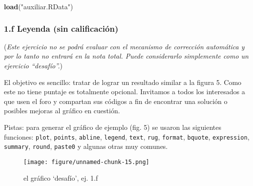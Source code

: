 \documentclass[]{article}
\makeatletter
\newenvironment{Shaded}{}{}
\newcommand{\KeywordTok}[1]{\textcolor[rgb]{0.00,0.44,0.13}{\textbf{{#1}}}}
\newcommand{\StringTok}[1]{\textcolor[rgb]{0.25,0.44,0.63}{{#1}}}
\newcommand{\NormalTok}[1]{{#1}}
\def\maxwidth{\ifdim\Gin@nat@width>\linewidth\linewidth
\else\Gin@nat@width\fi}
\let\Oldincludegraphics\includegraphics
\renewcommand{\includegraphics}[1]{\Oldincludegraphics[width=\maxwidth]{#1}}
\makeatother
\begin{document}
\begin{Shaded}
\begin{Highlighting}[]
\KeywordTok{load}\NormalTok{(}\StringTok{"auxiliar.RData"}\NormalTok{)}
\end{Highlighting}
\end{Shaded}

\subsubsection{1.f Leyenda (sin calificación)}

(\emph{Este ejercicio no se podrá evaluar con el mecanismo de corrección
automática y por lo tanto no entrará en la nota total. Puede
considerarlo simplemente como un ejercicio ``desafío''.})

El objetivo es sencillo: tratar de lograr un resultado similar a la
figura 5. Como este no tiene puntaje es totalmente opcional. Invitamos a
todos los interesados a que usen el foro y compartan sus códigos a fin
de encontrar una solución o posibles mejoras al gráfico en cuestión.

Pistas: para generar el gráfico de ejemplo (fig. 5) se usaron las
siguientes funciones: \texttt{plot}, \texttt{points}, \texttt{abline},
\texttt{legend}, \texttt{text}, \texttt{rug}, \texttt{format},
\texttt{bquote}, \texttt{expression}, \texttt{summary}, \texttt{round},
\texttt{paste0} y algunas otras muy comunes.

\begin{figure}[htbp]
\centering
\texttt{[image: figure/unnamed-chunk-15.png]}
\caption{el gráfico `desafío', ej. 1.f}
\end{figure}
\end{document}
